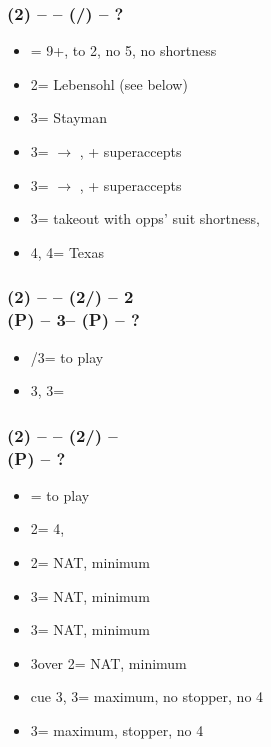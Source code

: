 \subsubsection*{(2\diams) -- \dbl -- (\hearts/\spades) -- ?}        
\begin{itemize}
    \item \dbl = 9+, \ftwon to 2\nt, no 5\major, no \major shortness
    \item 2\nt = Lebensohl (see below)
    \item 3\clubs = Stayman
    \item 3\diams = $\rightarrow$ \hearts, \gf + superaccepts
    \item 3\hearts = $\rightarrow$ \spades, \gf + superaccepts
    \item 3\spades = takeout with opps' suit shortness, \gf
    \item 4\diams, 4\hearts = Texas
\end{itemize}

\subsubsection*{(2\diams) -- \dbl -- (2\hearts/\spades) -- 2\nt \\
                (P) -- 3\clubs -- (P) -- ?}        
\begin{itemize}
    \item \pass/3\diams = to play
    \item 3\hearts, 3\spades = \inv
\end{itemize}

\subsubsection*{(2\diams) -- \dbl -- (2\hearts/\spades) -- \dbl \\
                (P) -- ?}        
\begin{itemize}
    \item \pass = to play
    \item 2\spades = 4\spades, \fonce
    \item 2\nt = NAT, minimum
    \item 3\clubs = NAT, minimum
    \item 3\diams = NAT, minimum
    \item 3\hearts over 2\spades = NAT, minimum
    \item cue 3\hearts, 3\spades = maximum, no stopper, no 4\spades
    \item 3\nt = maximum, stopper, no 4\spades
\end{itemize}

